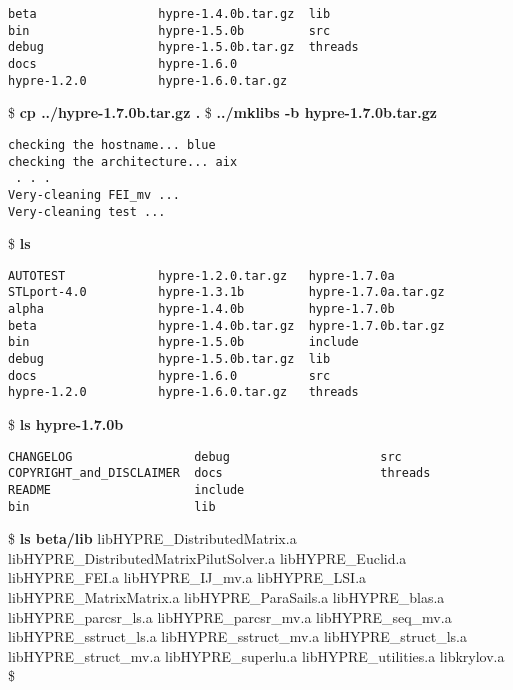 \begin{ttfamily}
\begin{mdseries}
\begin{verbatim}
beta                 hypre-1.4.0b.tar.gz  lib
bin                  hypre-1.5.0b         src
debug                hypre-1.5.0b.tar.gz  threads
docs                 hypre-1.6.0
hypre-1.2.0          hypre-1.6.0.tar.gz
\end{verbatim}
\$ \textbf{cp ../hypre-1.7.0b.tar.gz .}\linebreak
\$ \textbf{../mklibs -b hypre-1.7.0b.tar.gz}\linebreak
\begin{verbatim}
checking the hostname... blue
checking the architecture... aix
 . . .
Very-cleaning FEI_mv ...
Very-cleaning test ...
\end{verbatim}
\$ \textbf{ls}\linebreak
\begin{verbatim}
AUTOTEST             hypre-1.2.0.tar.gz   hypre-1.7.0a
STLport-4.0          hypre-1.3.1b         hypre-1.7.0a.tar.gz
alpha                hypre-1.4.0b         hypre-1.7.0b
beta                 hypre-1.4.0b.tar.gz  hypre-1.7.0b.tar.gz
bin                  hypre-1.5.0b         include
debug                hypre-1.5.0b.tar.gz  lib
docs                 hypre-1.6.0          src
hypre-1.2.0          hypre-1.6.0.tar.gz   threads
\end{verbatim}
\$ \textbf{ls hypre-1.7.0b}\linebreak
\begin{verbatim}
CHANGELOG                 debug                     src
COPYRIGHT_and_DISCLAIMER  docs                      threads
README                    include
bin                       lib
\end{verbatim}
\$ \textbf{ls beta/lib}\linebreak
libHYPRE\_DistributedMatrix.a\linebreak
libHYPRE\_DistributedMatrixPilutSolver.a\linebreak
libHYPRE\_Euclid.a\linebreak
libHYPRE\_FEI.a\linebreak
libHYPRE\_IJ\_mv.a\linebreak
libHYPRE\_LSI.a\linebreak
libHYPRE\_MatrixMatrix.a\linebreak
libHYPRE\_ParaSails.a\linebreak
libHYPRE\_blas.a\linebreak
libHYPRE\_parcsr\_ls.a\linebreak
libHYPRE\_parcsr\_mv.a\linebreak
libHYPRE\_seq\_mv.a\linebreak
libHYPRE\_sstruct\_ls.a\linebreak
libHYPRE\_sstruct\_mv.a\linebreak
libHYPRE\_struct\_ls.a\linebreak
libHYPRE\_struct\_mv.a\linebreak
libHYPRE\_superlu.a\linebreak
libHYPRE\_utilities.a\linebreak
libkrylov.a\linebreak
\$ \linebreak
\end{mdseries}
\end{ttfamily}
